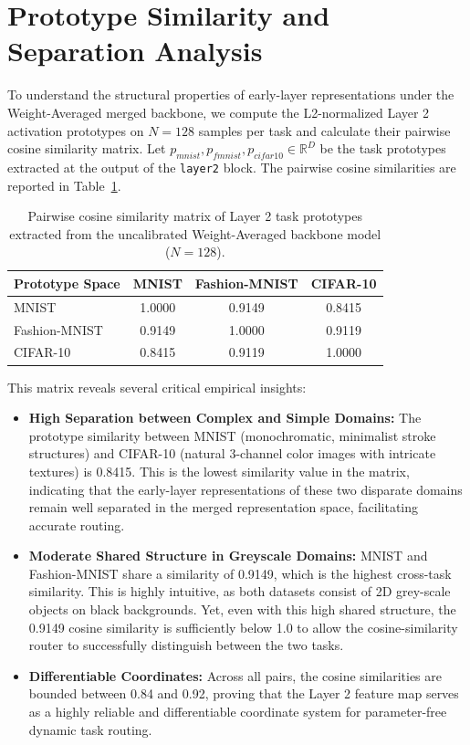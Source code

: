 \documentclass{article}
\theoremstyle{plain}
\theoremstyle{definition}
\theoremstyle{remark}
\begin{document}
\section{Prototype Similarity and Separation Analysis}
To understand the structural properties of early-layer representations under the Weight-Averaged merged backbone, we compute the L2-normalized Layer 2 activation prototypes on $N=128$ samples per task and calculate their pairwise cosine similarity matrix. Let $p_{mnist}, p_{fmnist}, p_{cifar10} \in \mathbb{R}^D$ be the task prototypes extracted at the output of the \texttt{layer2} block. 
The pairwise cosine similarities are reported in Table~\ref{tab:prototype_similarities}.

\begin{table}[H]
\caption{Pairwise cosine similarity matrix of Layer 2 task prototypes extracted from the uncalibrated Weight-Averaged backbone model ($N=128$).}
\label{tab:prototype_similarities}
\vskip 0.15in
\begin{center}
\begin{small}
\begin{tabular}{lccc}
\toprule
Prototype Space & MNIST & Fashion-MNIST & CIFAR-10 \\
\midrule
MNIST & 1.0000 & 0.9149 & 0.8415 \\
Fashion-MNIST & 0.9149 & 1.0000 & 0.9119 \\
CIFAR-10 & 0.8415 & 0.9119 & 1.0000 \\
\bottomrule
\end{tabular}
\end{small}
\end{center}
\end{table}

This matrix reveals several critical empirical insights:
\begin{itemize}
    \item \textbf{High Separation between Complex and Simple Domains:} The prototype similarity between MNIST (monochromatic, minimalist stroke structures) and CIFAR-10 (natural 3-channel color images with intricate textures) is 0.8415. This is the lowest similarity value in the matrix, indicating that the early-layer representations of these two disparate domains remain well separated in the merged representation space, facilitating accurate routing.
    \item \textbf{Moderate Shared Structure in Greyscale Domains:} MNIST and Fashion-MNIST share a similarity of 0.9149, which is the highest cross-task similarity. This is highly intuitive, as both datasets consist of 2D grey-scale objects on black backgrounds. Yet, even with this high shared structure, the 0.9149 cosine similarity is sufficiently below 1.0 to allow the cosine-similarity router to successfully distinguish between the two tasks.
    \item \textbf{Differentiable Coordinates:} Across all pairs, the cosine similarities are bounded between 0.84 and 0.92, proving that the Layer 2 feature map serves as a highly reliable and differentiable coordinate system for parameter-free dynamic task routing.
\end{itemize}
\end{document}
